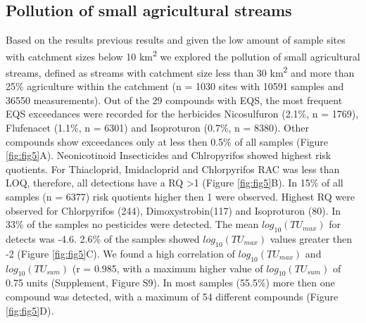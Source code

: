 \documentclass[journal=esthag,manuscript=article]{achemso}
\begin{document}
\subsection{Pollution of small agricultural streams}
Based on the results previous results and given the low amount of sample sites with catchment sizes below 10 km\textsuperscript{2} we explored the pollution of small agricultural streams, defined as streams with catchment size less than 30 km\textsuperscript{2} and more than 25\% agriculture within the catchment (n = 1030 sites with 10591 samples and 36550 measurements).
Out of the 29 compounds with EQS, the most frequent EQS exceedances were recorded for the herbicides Nicosulfuron (2.1\%, n = 1769), Flufenacet (1.1\%, n = 6301) and Isoproturon (0.7\%, n = 8380). 
Other compounds show exceedances only at less then 0.5\% of all samples (Figure \ref{fig:fig5}A).
Neonicotinoid Insecticides and Chlropyrifos showed highest risk quotients.
For Thiacloprid, Imidacloprid and Chlorpyrifos RAC was less than LOQ, therefore, all detections have a RQ \textgreater 1 (Figure \ref{fig:fig5}B). 
In 15\% of all samples (n = 6377) risk quotients higher then 1 were observed.
Highest RQ were observed for Chlorpyrifos (244), Dimoxystrobin(117) and Isoproturon (80). 
In 33\% of the samples no pesticides were detected. 
The mean $log_{10}(TU_{max})$ for detects was -4.6.
2.6\% of the samples showed $log_{10}(TU_{max})$ values greater then -2 (Figure \ref{fig:fig5}C).
We found a high correlation of $log_{10}(TU_{max})$ and $log_{10}(TU_{sum})$ (r = 0.985, with a maximum higher value of $log_{10}(TU_{sum})$ of 0.75 units (Supplement, Figure S9).
In most samples (55.5\%) more then one compound was detected, with a maximum of 54 different compounds (Figure \ref{fig:fig5}D). 

\end{document}
